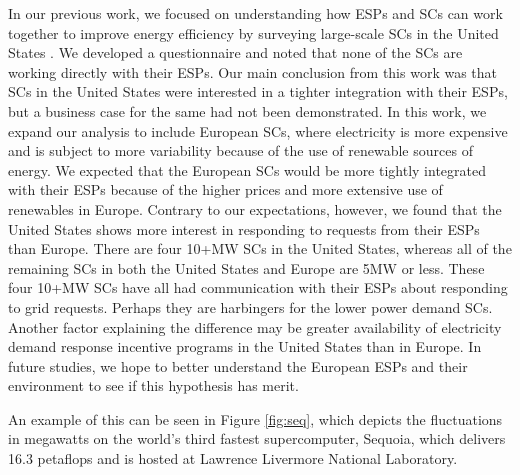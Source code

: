 In our previous work, we focused on understanding how ESPs and SCs can work together to improve energy efficiency by surveying large-scale SCs in the United States \cite{BatesESP}. We developed a questionnaire and noted that none of the SCs are working directly with their ESPs. Our main conclusion from this work was that SCs in the United States were interested in a tighter integration with their ESPs, but a business case for the same had not been demonstrated. In this work, we expand our analysis to include European SCs, where electricity is more expensive and is subject to more variability because of the use of renewable sources of energy. We expected that the European SCs would be more tightly integrated with their ESPs because of the higher prices and more extensive use of renewables in Europe.  Contrary to our expectations, however, we found that the United States shows more interest in responding to requests from their ESPs than Europe.  There are four 10+MW SCs in the United States, whereas all of the remaining SCs in both the United States and Europe are 5MW or less.  These four 10+MW SCs have all had communication with their ESPs about responding to grid requests.  Perhaps they are harbingers for the lower power demand SCs.  Another factor explaining the difference may be greater availability of electricity demand response incentive programs in the United States than in Europe. In future studies, we hope to better understand the European ESPs and their environment to see if this hypothesis has merit. 

An example of this can be seen in Figure \ref{fig:seq}, which depicts the fluctuations in megawatts on the world's third fastest supercomputer, Sequoia, which delivers 16.3 petaflops and is hosted at Lawrence Livermore National Laboratory.

